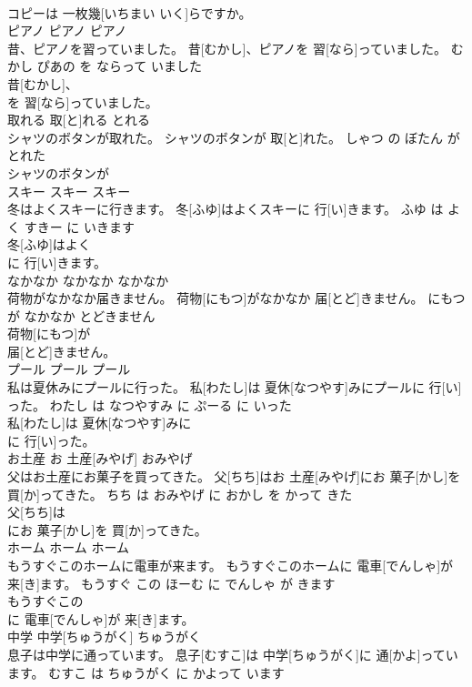 \documentclass[8pt]{extreport}
\begin{document}
\begin{CJK}{UTF8}{min}
\\	コピーは 一枚幾[いちまい いく]らですか。			
\\	ピアノ	ピアノ	ピアノ	
\\	昔、ピアノを習っていました。	昔[むかし]、ピアノを 習[なら]っていました。	むかし ぴあの を ならって いました	
\\	昔[むかし]、
\\	を 習[なら]っていました。			
\\	取れる	取[と]れる	とれる	
\\	シャツのボタンが取れた。	シャツのボタンが 取[と]れた。	しゃつ の ぼたん が とれた	
\\	シャツのボタンが
\\	スキー	スキー	スキー	
\\	冬はよくスキーに行きます。	冬[ふゆ]はよくスキーに 行[い]きます。	ふゆ は よく すきー に いきます	
\\	冬[ふゆ]はよく
\\	に 行[い]きます。			
\\	なかなか	なかなか	なかなか	
\\	荷物がなかなか届きません。	荷物[にもつ]がなかなか 届[とど]きません。	にもつ が なかなか とどきません	
\\	荷物[にもつ]が
\\	届[とど]きません。			
\\	プール	プール	プール	
\\	私は夏休みにプールに行った。	私[わたし]は 夏休[なつやす]みにプールに 行[い]った。	わたし は なつやすみ に ぷーる に いった	
\\	私[わたし]は 夏休[なつやす]みに
\\	に 行[い]った。			
\\	お土産	お 土産[みやげ]	おみやげ	
\\	父はお土産にお菓子を買ってきた。	父[ちち]はお 土産[みやげ]にお 菓子[かし]を 買[か]ってきた。	ちち は おみやげ に おかし を かって きた	
\\	父[ちち]は
\\	にお 菓子[かし]を 買[か]ってきた。			
\\	ホーム	ホーム	ホーム	
\\	もうすぐこのホームに電車が来ます。	もうすぐこのホームに 電車[でんしゃ]が 来[き]ます。	もうすぐ この ほーむ に でんしゃ が きます	
\\	もうすぐこの
\\	に 電車[でんしゃ]が 来[き]ます。			
\\	中学	中学[ちゅうがく]	ちゅうがく	
\\	息子は中学に通っています。	息子[むすこ]は 中学[ちゅうがく]に 通[かよ]っています。	むすこ は ちゅうがく に かよって います	

\end{CJK}
\end{document}
